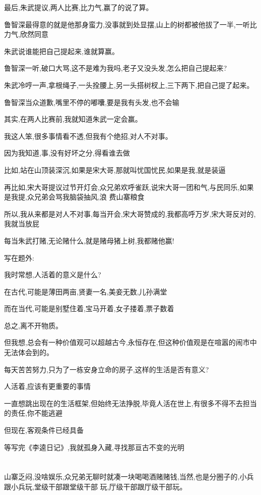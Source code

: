 ﻿\documentclass[12pt]{article}
\begin{document}
最后,朱武提议,两人比赛,比力气,赢了的说了算。

鲁智深最得意的就是他那身蛮力,没事就到处显摆,山上的树都被他拔了一半,一听比力气,欣然同意

朱武说谁能把自己提起来,谁就算赢。

鲁智深一听,破口大骂,这不是难为我吗,老子又没头发,怎么把自己提起来?

朱武冷哼一声,拿根绳子,一头拴腰上,另一头搭树杈上,三下两下,把自己提了起来。

鲁智深当众道歉,嘴里不停的嘟囔,要是我有头发,也不会输

其实,在两人比赛前,我就知道朱武一定会赢。

我这人笨,很多事情看不透,但我有个绝招,对人不对事。

因为我知道,事,没有好坏之分,得看谁去做

比如,站在山顶装深沉,如果是宋大哥,那就叫忧国忧民,如果是我,就是装逼

再比如,宋大哥提议过节开灯会,众兄弟欢呼雀跃,说宋大哥一团和气,与民同乐,如果是我提,众兄弟会骂我脑袋抽风,浪
费山寨粮食

所以,我从来都是对人不对事,每当开会,宋大哥赞成的,我都高呼万岁,宋大哥反对的,我就当放屁

每当朱武打赌,无论赌什么,就是赌母猪上树,我都赌他赢!

写在题外:

我时常想,人活着的意义是什么?

在古代,可能是薄田两亩,贤妻一名,美妾无数,儿孙满堂\dldots

而在当代,可能是别墅住着,宝马开着,女子搂着,票子数着\dldots

总之,离不开物质。

但我想,总会有一种价值观可以超越古今,永恒存在,但这种价值观是在喧嚣的闹市中无法体会到的。

每天苦苦努力,只为了一栋安身立命的房子,这样的生活是否有意义?

人活着,应该有更重要的事情

一直想跳出现在的生活框架,但始终无法挣脱,毕竟人活在世上,有很多不得不去担当的责任,你不能逃避\dldots

但现在,客观条件已经具备

等写完《李逵日记》,我就孤身入藏,寻找那亘古不变的光明

\section{}

山寨乏闷,没啥娱乐,众兄弟无聊时就凑一块喝喝酒赌赌钱,当然,也是分圈子的,小兵跟小兵玩,堂级干部跟堂级干部
玩,厅级干部跟厅级干部玩。
\end{document}
